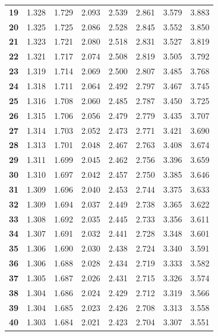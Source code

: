 \begin{center}
\begin{tabular}{c|c|c|c|c|c|c|c}
\textbf{19} & 1.328 & 1.729 & 2.093  & 2.539  & 2.861  & 3.579   & 3.883   \\
\textbf{20} & 1.325 & 1.725 & 2.086  & 2.528  & 2.845  & 3.552   & 3.850   \\
\textbf{21} & 1.323 & 1.721 & 2.080  & 2.518  & 2.831  & 3.527   & 3.819   \\
\textbf{22} & 1.321 & 1.717 & 2.074  & 2.508  & 2.819  & 3.505   & 3.792   \\
\textbf{23} & 1.319 & 1.714 & 2.069  & 2.500  & 2.807  & 3.485   & 3.768   \\
\textbf{24} & 1.318 & 1.711 & 2.064  & 2.492  & 2.797  & 3.467   & 3.745   \\
\textbf{25} & 1.316 & 1.708 & 2.060  & 2.485  & 2.787  & 3.450   & 3.725   \\
\textbf{26} & 1.315 & 1.706 & 2.056  & 2.479  & 2.779  & 3.435   & 3.707   \\
\textbf{27} & 1.314 & 1.703 & 2.052  & 2.473  & 2.771  & 3.421   & 3.690   \\
\textbf{28} & 1.313 & 1.701 & 2.048  & 2.467  & 2.763  & 3.408   & 3.674   \\
\textbf{29} & 1.311 & 1.699 & 2.045  & 2.462  & 2.756  & 3.396   & 3.659   \\
\textbf{30} & 1.310 & 1.697 & 2.042  & 2.457  & 2.750  & 3.385   & 3.646   \\
\textbf{31} & 1.309 & 1.696 & 2.040  & 2.453  & 2.744  & 3.375   & 3.633   \\
\textbf{32} & 1.309 & 1.694 & 2.037  & 2.449  & 2.738  & 3.365   & 3.622   \\
\textbf{33} & 1.308 & 1.692 & 2.035  & 2.445  & 2.733  & 3.356   & 3.611   \\
\textbf{34} & 1.307 & 1.691 & 2.032  & 2.441  & 2.728  & 3.348   & 3.601   \\
\textbf{35} & 1.306 & 1.690 & 2.030  & 2.438  & 2.724  & 3.340   & 3.591   \\
\textbf{36} & 1.306 & 1.688 & 2.028  & 2.434  & 2.719  & 3.333   & 3.582   \\
\textbf{37} & 1.305 & 1.687 & 2.026  & 2.431  & 2.715  & 3.326   & 3.574   \\
\textbf{38} & 1.304 & 1.686 & 2.024  & 2.429  & 2.712  & 3.319   & 3.566   \\
\textbf{39} & 1.304 & 1.685 & 2.023  & 2.426  & 2.708  & 3.313   & 3.558   \\
\textbf{40} & 1.303 & 1.684 & 2.021  & 2.423  & 2.704  & 3.307   & 3.551  \bstrut\\
\hline
\end{tabular}
\end{center}